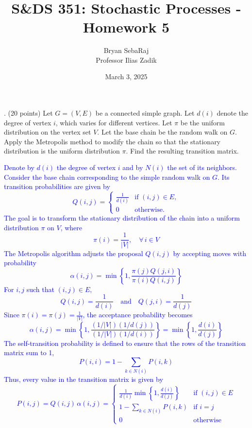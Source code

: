 \documentclass{article}
\title{S\&DS 351: Stochastic Processes - Homework 5}
\author{Bryan SebaRaj \\[0.8em] Professor Ilias Zadik}
\date{March 3, 2025}
\begin{document}
\maketitle

. (20 points) Let $G = (V, E)$ be a connected simple graph. Let $d(i)$ denote the degree of vertex $i$, which varies for different vertices. Let $\pi$ be the uniform distribution on the vertex set $V$. Let the base chain be the random walk on $G$. Apply the Metropolis method to modify the chain so that the stationary distribution is the uniform distribution $\pi$. Find the resulting transition matrix.

\textcolor{blue}{
    Denote by \( d(i) \) the degree of vertex \( i \) and by \( N(i) \) the set of its neighbors. Consider the base chain corresponding to the simple random walk on \( G \). Its transition probabilities are given by
\[
Q(i,j) =
\begin{cases}
\frac{1}{d(i)} & \text{if } (i,j) \in E, \\
0 & \text{otherwise.}
\end{cases}
\]
The goal is to transform the stationary distribution of the chain into a uniform distribution \(\pi\) on \(V\), where
\[
\pi(i)=\frac{1}{|V|}, \quad \forall\, i\in V
\]
The Metropolis algorithm adjusts the proposal \( Q(i,j) \) by accepting moves with probability
\[
\alpha(i,j) = \min\left\{ 1, \frac{\pi(j) Q(j,i)}{\pi(i) Q(i,j)} \right\}
\]
For \( i,j \) such that \( (i,j) \in E \),
\[
Q(i,j) = \frac{1}{d(i)} \quad \text{and} \quad Q(j,i) = \frac{1}{d(j)}
\]
Since \(\pi(i)=\pi(j)=\frac{1}{|V|}\), the acceptance probability becomes
\[
\alpha(i,j) = \min\left\{ 1, \frac{(1/|V|)(1/d(j))}{(1/|V|)(1/d(i))} \right\} 
= \min\left\{ 1, \frac{d(i)}{d(j)} \right\}
\]
The self-transition probability is defined to ensure that the rows of the transition matrix sum to 1,
\[
P(i,i) = 1 - \sum_{k \in N(i)} P(i,k)
\]
Thus, every value in the transition matrix is given by
\[
P(i,j) = Q(i,j)\,\alpha(i,j) =
\begin{cases}
\frac{1}{d(i)} \min\left\{ 1, \frac{d(i)}{d(j)} \right\} & \text{if } (i,j)\in E \\
1 - \sum_{k \in N(i)} P(i,k) & \text{if } i=j \\
0 & \text{otherwise}
\end{cases}
\]
}
\end{document}
